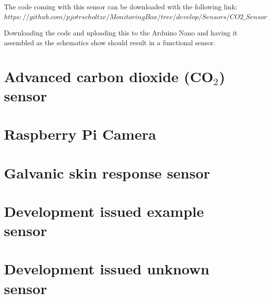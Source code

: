 \documentclass{report}
\begin{document}
The code coming with this sensor can be downloaded with the following link: $ https://github.com/pjotrscholtze/MonitoringBox/tree/develop/Sensors/CO2\_Sensor $


Downloading the code and uploading this to the Arduino Nano and having it assembled as the schematics show should result in a functional sensor. 

\chapter{Advanced carbon dioxide (CO$_2$) sensor}

\chapter{Raspberry Pi Camera}

\chapter{Galvanic skin response sensor}

\chapter{Development issued example sensor}

\chapter{Development issued unknown sensor}
\end{document}
